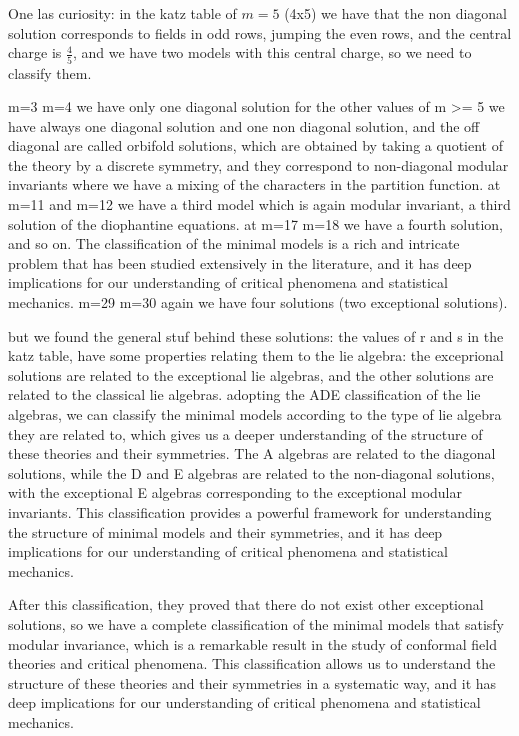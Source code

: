 One las curiosity: in the katz table of \(m=5\) (4x5) we have that the non diagonal solution corresponds to fields in odd rows, jumping the even rows, and the central charge is \(\frac{4}{5}\), and we have two models with this central charge, so we need to classify them.

m=3 m=4 we have only one diagonal solution
for the other values of m >= 5 we have always one diagonal solution and one non diagonal solution, and the off diagonal are called orbifold solutions, which are obtained by taking a quotient of the theory by a discrete symmetry, and they correspond to non-diagonal modular invariants where we have a mixing of the characters in the partition function.
at m=11 and m=12 we have a third model which is again modular invariant, a third solution of the diophantine equations.
at m=17 m=18 we have a fourth solution, and so on. The classification of the minimal models is a rich and intricate problem that has been studied extensively in the literature, and it has deep implications for our understanding of critical phenomena and statistical mechanics.
m=29 m=30 again we have four solutions (two exceptional solutions).

but we found the general stuf behind these solutions: the values of r and s in the katz table, have some properties relating them to the lie algebra: the exceprional solutions are related to the exceptional lie algebras, and the other solutions are related to the classical lie algebras.
adopting the ADE classification of the lie algebras, we can classify the minimal models according to the type of lie algebra they are related to, which gives us a deeper understanding of the structure of these theories and their symmetries. The A algebras are related to the diagonal solutions, while the D and E algebras are related to the non-diagonal solutions, with the exceptional E algebras corresponding to the exceptional modular invariants. This classification provides a powerful framework for understanding the structure of minimal models and their symmetries, and it has deep implications for our understanding of critical phenomena and statistical mechanics.

After this classification, they proved that there do not exist other exceptional solutions, so we have a complete classification of the minimal models that satisfy modular invariance, which is a remarkable result in the study of conformal field theories and critical phenomena. This classification allows us to understand the structure of these theories and their symmetries in a systematic way, and it has deep implications for our understanding of critical phenomena and statistical mechanics.

